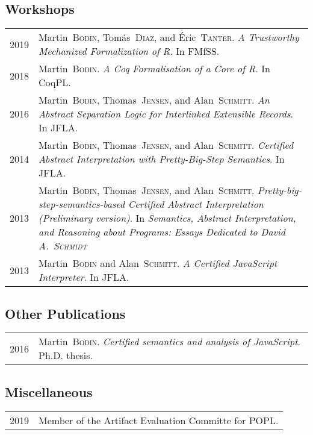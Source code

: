 \documentclass[12pt,a4paper]{article}
\makeatletter
\newenvironment{datecvsection}[1]%
               {\subsection*{#1}%
                 \noindent \begin{tabular}{@{}p{\annee}p{\texte}@{}}}
               {\end{tabular}}
\newcommand\familyName{\textsc}
\makeatother
\begin{document}
\begin{datecvsection}{Workshops}

  2019 & Martin~\familyName{Bodin}, Tomás~\familyName{Diaz}, and Éric~\familyName{Tanter}. \textit{A Trustworthy Mechanized Formalization of R}. In FMfSS. \\

  2018 & Martin~\familyName{Bodin}. \textit{A Coq Formalisation of a Core of R}. In CoqPL. \\

  2016 & Martin~\familyName{Bodin}, Thomas~\familyName{Jensen}, and Alan~\familyName{Schmitt}. \textit{An Abstract Separation Logic for Interlinked Extensible Records}. In JFLA. \\

  2014 & Martin~\familyName{Bodin}, Thomas~\familyName{Jensen}, and Alan~\familyName{Schmitt}. \textit{Certified Abstract Interpretation with Pretty-Big-Step Semantics}. In JFLA. \\

  2013 & Martin~\familyName{Bodin}, Thomas~\familyName{Jensen}, and Alan~\familyName{Schmitt}. \textit{Pretty-big-step-semantics-based Certified Abstract Interpretation (Preliminary version)}. In \textit{Semantics, Abstract Interpretation, and Reasoning about Programs: Essays Dedicated to David A.~\familyName{Schmidt}} \\ %

  2013 & Martin~\familyName{Bodin} and Alan~\familyName{Schmitt}. \textit{A Certified JavaScript Interpreter}. In JFLA. \\

\end{datecvsection}

\begin{datecvsection}{Other Publications}

    2016 & Martin~\familyName{Bodin}. \textit{Certified semantics and analysis of JavaScript}. Ph.D. thesis. \\

\end{datecvsection}

\begin{datecvsection}{Miscellaneous}

    2019 & Member of the Artifact Evaluation Committe for POPL. \\

\end{datecvsection}
\end{document}
